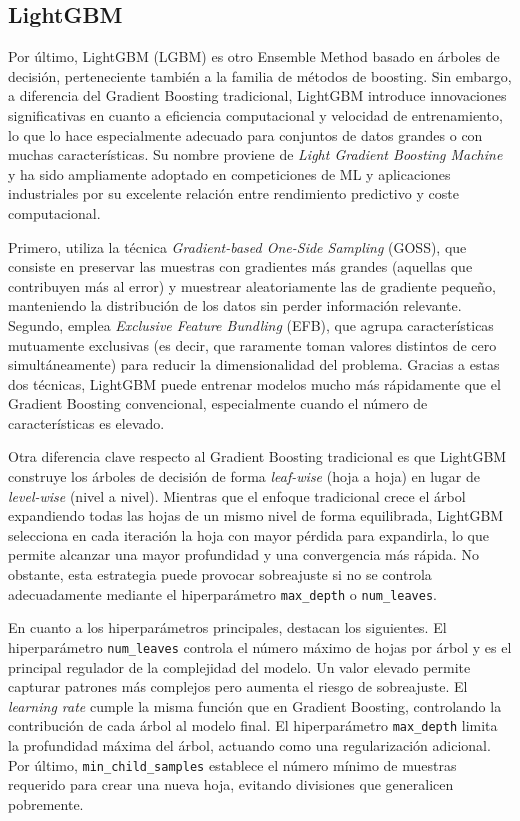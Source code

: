 \subsection{LightGBM}
Por último, LightGBM (LGBM) \cite{lightgbm} es otro Ensemble Method basado en árboles de decisión, perteneciente también a la familia de métodos de boosting. Sin embargo, a diferencia del Gradient Boosting tradicional, LightGBM introduce innovaciones significativas en cuanto a eficiencia computacional y velocidad de entrenamiento, lo que lo hace especialmente adecuado para conjuntos de datos grandes o con muchas características. Su nombre proviene de \textit{Light Gradient Boosting Machine} y ha sido ampliamente adoptado en competiciones de ML y aplicaciones industriales por su excelente relación entre rendimiento predictivo y coste computacional.

Primero, utiliza la técnica \textit{Gradient-based One-Side Sampling} (GOSS), que consiste en preservar las muestras con gradientes más grandes (aquellas que contribuyen más al error) y muestrear aleatoriamente las de gradiente pequeño, manteniendo la distribución de los datos sin perder información relevante. Segundo, emplea \textit{Exclusive Feature Bundling} (EFB), que agrupa características mutuamente exclusivas (es decir, que raramente toman valores distintos de cero simultáneamente) para reducir la dimensionalidad del problema. Gracias a estas dos técnicas, LightGBM puede entrenar modelos mucho más rápidamente que el Gradient Boosting convencional, especialmente cuando el número de características es elevado.

Otra diferencia clave respecto al Gradient Boosting tradicional es que LightGBM construye los árboles de decisión de forma \textit{leaf-wise} (hoja a hoja) en lugar de \textit{level-wise} (nivel a nivel). Mientras que el enfoque tradicional crece el árbol expandiendo todas las hojas de un mismo nivel de forma equilibrada, LightGBM selecciona en cada iteración la hoja con mayor pérdida para expandirla, lo que permite alcanzar una mayor profundidad y una convergencia más rápida. No obstante, esta estrategia puede provocar sobreajuste si no se controla adecuadamente mediante el hiperparámetro \texttt{max\_depth} o \texttt{num\_leaves}.

En cuanto a los hiperparámetros principales, destacan los siguientes. El hiperparámetro \texttt{num\_leaves} controla el número máximo de hojas por árbol y es el principal regulador de la complejidad del modelo. Un valor elevado permite capturar patrones más complejos pero aumenta el riesgo de sobreajuste. El \textit{learning rate} cumple la misma función que en Gradient Boosting, controlando la contribución de cada árbol al modelo final. El hiperparámetro \texttt{max\_depth} limita la profundidad máxima del árbol, actuando como una regularización adicional. Por último, \texttt{min\_child\_samples} establece el número mínimo de muestras requerido para crear una nueva hoja, evitando divisiones que generalicen pobremente.

